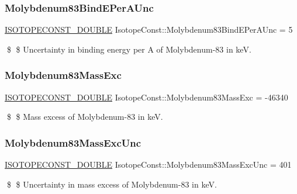 \subsubsection{\texorpdfstring{Molybdenum83\+Bind\+E\+Per\+A\+Unc}{Molybdenum83BindEPerAUnc}}
{\footnotesize\ttfamily \mbox{\hyperlink{group___isotope_const-_macros_ga8f45a7272ce02c0b4c65c44636ed719a}{I\+S\+O\+T\+O\+P\+E\+C\+O\+N\+S\+T\+\_\+\+D\+O\+U\+B\+LE}} Isotope\+Const\+::\+Molybdenum83\+Bind\+E\+Per\+A\+Unc = 5}

\$ \$ Uncertainty in binding energy per A of Molybdenum-\/83 in keV. \mbox{\label{group___isotope_const-_molybdenum-_mo83_gaa49a24c3a685ef0888ac6f91efeb5180}} 
\subsubsection{\texorpdfstring{Molybdenum83\+Mass\+Exc}{Molybdenum83MassExc}}
{\footnotesize\ttfamily \mbox{\hyperlink{group___isotope_const-_macros_ga8f45a7272ce02c0b4c65c44636ed719a}{I\+S\+O\+T\+O\+P\+E\+C\+O\+N\+S\+T\+\_\+\+D\+O\+U\+B\+LE}} Isotope\+Const\+::\+Molybdenum83\+Mass\+Exc = -\/46340}

\$ \$ Mass excess of Molybdenum-\/83 in keV. \mbox{\label{group___isotope_const-_molybdenum-_mo83_ga15ca3e7db6ad29ea191b43008aaf4d06}} 
\subsubsection{\texorpdfstring{Molybdenum83\+Mass\+Exc\+Unc}{Molybdenum83MassExcUnc}}
{\footnotesize\ttfamily \mbox{\hyperlink{group___isotope_const-_macros_ga8f45a7272ce02c0b4c65c44636ed719a}{I\+S\+O\+T\+O\+P\+E\+C\+O\+N\+S\+T\+\_\+\+D\+O\+U\+B\+LE}} Isotope\+Const\+::\+Molybdenum83\+Mass\+Exc\+Unc = 401}

\$ \$ Uncertainty in mass excess of Molybdenum-\/83 in keV. \mbox{\label{group___isotope_const-_molybdenum-_mo83_ga97f27cf0f5aeac768599b3a8c43148c6}} 
